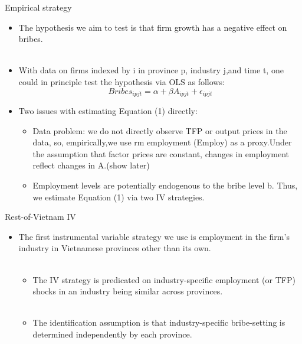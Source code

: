\documentclass{beamer}
\begin{document}
\begin{frame}{Empirical strategy}
\begin{itemize}
\item The hypothesis we aim to test is that firm growth has a negative effect on bribes. \\~
\item With data on firms indexed by i in province p, industry j,and time t, one could in principle test the hypothesis via OLS as follows:
\begin{equation}
Bribes_{ipjt}=\alpha +\beta A_{ipjt}+\epsilon _{ipjt}
\end{equation}

\item Two issues with estimating Equation (1) directly:
\begin{itemize}
\item Data problem: we do not directly observe TFP or output prices in the data, so, empirically,we use rm employment (Employ) as a proxy.Under the assumption that factor prices are constant, changes in employment reflect changes in A.(show later)
\item Employment levels are potentially endogenous to the bribe level b. Thus, we estimate Equation (1) via two IV strategies.
\end{itemize}

\end{itemize}

\end{frame}	

\begin{frame}{Rest-of-Vietnam IV}

\begin{itemize}
\item The first instrumental variable strategy we use is employment in the firm's industry in Vietnamese provinces other than its own.\\~
\begin{itemize}
\item The IV strategy is predicated on industry-specific employment (or TFP) shocks in an industry being similar across provinces.\\~
\item The identification assumption is that industry-specific bribe-setting is determined independently by each province. 

\end{itemize}

\end{itemize}

\end{frame}	
\end{document}
